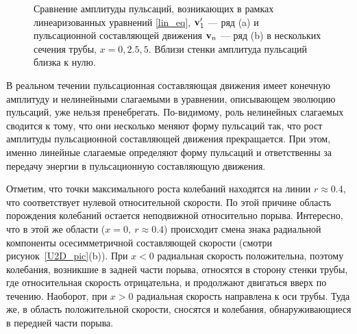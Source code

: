 \begin{figure}
\caption{Сравнение амплитуды пульсаций, возникающих в рамках линеаризованных уравнений \eqref{lin_eq}, $\mathbf{v}'_1$ --- ряд (a) и пульсационной составляющей движения $\mathbf{v}_n$ --- ряд (b) в нескольких сечения трубы, $x = 0, 2.5, 5$. Вблизи стенки амплитуда пульсаций близка к нулю.}
\label{lin_amp_cmp_pic}
\end{figure}

В реальном течении пульсационная составляющая движения имеет конечную амплитуду и нелинейными слагаемыми в уравнении, описывающем эволюцию пульсаций, уже нельзя пренебрегать. По-видимому, роль нелинейных слагаемых сводится к тому, что они несколько меняют форму пульсаций так, что рост амплитуды пульсационной составляющей движения прекращается. При этом, именно линейные слагаемые определяют форму пульсаций и ответственны за передачу энергии в пульсационную составляющую движения. 

Отметим, что точки максимального роста колебаний находятся на линии $r \approx 0.4$, что соответствует нулевой относительной скорости. По этой причине область порождения колебаний остается неподвижной относительно порыва. Интересно, что в этой же области ($x = 0,\ r \approx 0.4$) происходит смена знака радиальной компоненты осесимметричной составляющей скорости (смотри рисунок~\ref{U2D_pic}(b)). При $x<0$ радиальная скорость положительна, поэтому колебания, возникшие в задней части порыва, относятся в сторону стенки трубы, где относительная скорость отрицательна, и продолжают двигаться вверх по течению. Наоборот, при $x>0$ радиальная скорость направлена к оси трубы. Туда же, в область положительной скорости, сносятся и колебания, обнаруживающиеся в передней части порыва.

